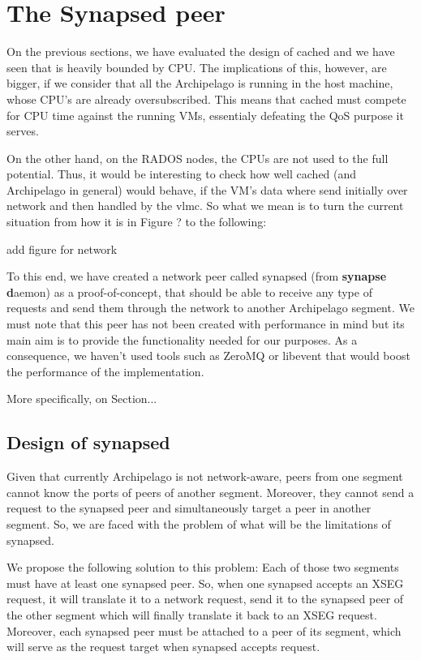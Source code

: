 \chapter{The Synapsed peer}

On the previous sections, we have evaluated the design of cached and we have 
seen that is heavily bounded by CPU. The implications of this, however,
are bigger, if we consider that all the Archipelago is running in the host 
machine, whose CPU's are already oversubscribed. This means that cached must 
compete for CPU time against the running VMs, essentialy defeating the QoS 
purpose it serves.

On the other hand, on the RADOS nodes, the CPUs are not used to the full 
potential. Thus, it would be interesting to check how well cached (and 
Archipelago in general) would behave, if the VM's data where send initially 
over network and then handled by the vlmc. So what we mean is to turn the 
current situation from how it is in Figure ? to the following:

\fixme add figure for network

To this end, we have created a network peer called synapsed (from 
\textbf{synapse d}aemon) as a proof-of-concept, that should be able to receive 
any type of requests and send them through the network to another Archipelago 
segment. We must note that this peer has not been created with performance in 
mind but its main aim is to provide the functionality needed for our purposes.  
As a consequence, we haven't used tools such as ZeroMQ or libevent that would 
boost the performance of the implementation.

More specifically, on Section...

\section{Design of synapsed}

Given that currently Archipelago is not network-aware, peers from one segment 
cannot know the ports of peers of another segment. Moreover, they cannot send a 
request to the synapsed peer and simultaneously target a peer in another 
segment. So, we are faced with the problem of what will be the limitations of 
synapsed.

We propose the following solution to this problem: Each of those two segments 
must have at least one synapsed peer. So, when one synapsed accepts an XSEG 
request, it will translate it to a network request, send it to the synapsed 
peer of the other segment which will finally translate it back to an XSEG 
request.  Moreover, each synapsed peer must be attached to a peer of its 
segment, which will serve as the request target when synapsed accepts request.  

